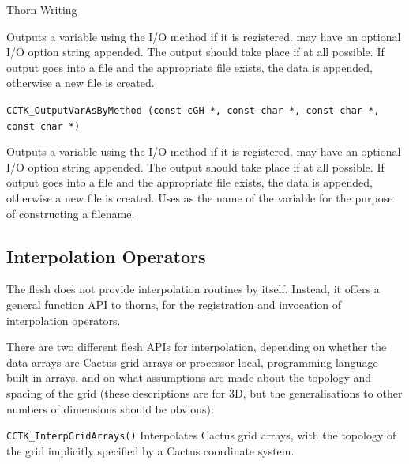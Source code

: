 \begin{cactuspart}{Thorn Writing}
\begin{description}
Outputs a variable  using the I/O method  if it is
registered.  may have an optional I/O option string appended.
The output should take place if at all possible.  If
output goes into a file and the appropriate file exists, the data is
appended, otherwise a new file is created.

\item \texttt{CCTK\_OutputVarAsByMethod (const cGH *,
                                     const char *,
                                     const char *,\\
                                     const char *)}

Outputs a variable  using the I/O method  if it is
registered.  may have an optional I/O option string appended.
The output should take place if at all possible.
If output goes into a file and the appropriate file exists, the data is
appended, otherwise a new file is created.  Uses  as the
name of the variable for the purpose of constructing a filename.

\end{description}


\subsection{Interpolation Operators}
\label{sec:inop}

The flesh does not provide interpolation routines by itself. Instead,
it offers a general function API to thorns, for the registration and
invocation of interpolation operators.

There are two different flesh APIs for interpolation, depending
on whether the data arrays are Cactus grid arrays or processor-local,
programming language built-in arrays, and on what assumptions
are made about the topology and spacing of the grid (these descriptions
are for 3D, but the generalisations to other numbers of dimensions
should be obvious):
\begin{Lentry}
\item[\texttt{CCTK\_InterpGridArrays()}]
        Interpolates Cactus grid arrays, with the topology of the
        grid implicitly specified by a Cactus coordinate system.


\end{Lentry}
\end{cactuspart}
